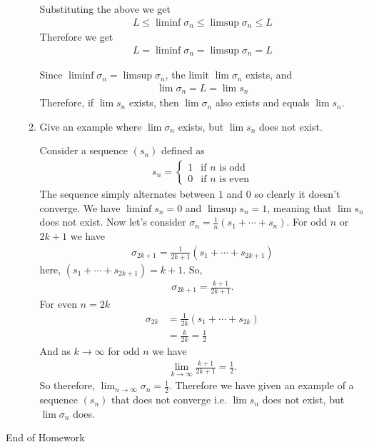 \documentclass [10pt]{article}
\newcommand{\jg}[1]{{\color{blue} #1}}
\begin{document}
\begin{enumerate}
\begin{enumerate}
{Substituting the above we get
\begin{align*}
L \leq \liminf \sigma_n \leq \limsup \sigma_n \leq L
\end{align*}
Therefore we get
\begin{align*}
L = \liminf \sigma_n = \limsup \sigma_n = L
\end{align*}

Since $\liminf \sigma_n = \limsup \sigma_n$, the limit $\lim \sigma_n$ exists, and
\begin{align*}
\lim \sigma_n = L = \lim s_n
\end{align*}
Therefore, if $\lim s_n$ exists, then $\lim \sigma_n$ also exists and equals $\lim s_n$.

}
\item Give an example where $\lim \sigma_n$ exists, but $\lim s_n$ does not
exist.

\jg{
Consider a sequence $(s_n)$ defined as
\begin{align*}
s_n = 
\begin{cases} 
1 & \text{if } n \text{ is odd} \\
0 & \text{if } n \text{ is even}
\end{cases}
\end{align*}
The sequence simply alternates between $1$ and $0$ so clearly it doesn't converge. We have $\liminf s_n = 0$ and $\limsup s_n = 1$, meaning that $\lim s_n$ does not exist. Now let's consider $\sigma_n = \frac{1}{n} (s_1 + \cdots + s_n)$. For odd $n$ or $2k + 1$ we have 
\begin{align*}
    \sigma_{2k+1} = \frac{1}{2k+1} (s_1 + \cdots + s_{2k+1})
\end{align*}
here, $(s_1 + \cdots + s_{2k+1}) = k + 1$. So, 
\begin{align*}
    \sigma_{2k+1} = \frac{k+1}{2k+1}.
\end{align*}
For even $n = 2k$
\begin{align*}
    \sigma_{2k} &= \frac{1}{2k} (s_1 + \cdots + s_{2k}) \\
    &= \frac{k}{2k} = \frac{1}{2}
\end{align*}
And as $k \rightarrow \infty$ for odd $n$ we have 
\begin{align*}
    \lim_{k \rightarrow \infty} \frac{k+1}{2k+1} = \frac{1}{2}. 
\end{align*}
So therefore, $\lim_{n \rightarrow \infty} \sigma_n = \frac{1}{2}$. Therefore we have given an example of a sequence $(s_n)$ that does not converge i.e. $\lim s_n$ does not exist, but $\lim \sigma_n$ does. 
}
\end{enumerate}
\end{enumerate}

\clearpage
\begin{center}
\vspace*{\fill}
{\Large End of Homework}
\vspace*{\fill}
\end{center}
\end{document}
